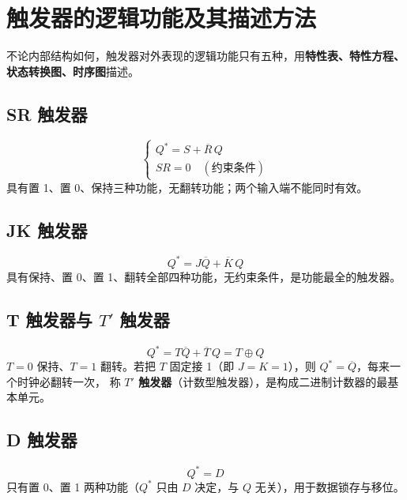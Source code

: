 \section{触发器的逻辑功能及其描述方法}
不论内部结构如何，触发器对外表现的逻辑功能只有五种，用\textbf{特性表、特性方程、状态转换图、时序图}描述。

\subsection{SR 触发器}
\begin{equation}
\begin{cases}
Q^* = S + \overline{R}\,Q\\
SR = 0 \quad(\text{约束条件})
\end{cases}
\label{eq:sr}
\end{equation}
具有置 1、置 0、保持三种功能，无翻转功能；两个输入端不能同时有效。

\subsection{JK 触发器}
\begin{equation}
Q^* = J\overline{Q} + \overline{K}\,Q
\label{eq:jk2}
\end{equation}
具有保持、置 0、置 1、翻转全部四种功能，无约束条件，是功能最全的触发器。

\subsection{T 触发器与 $T'$ 触发器}
\begin{equation}
Q^* = T\overline{Q} + \overline{T}\,Q = T \oplus Q
\label{eq:t}
\end{equation}
$T=0$ 保持、$T=1$ 翻转。若把 $T$ 固定接 1（即 $J=K=1$），则 $Q^*=\overline{Q}$，每来一个时钟必翻转一次，
称 \textbf{$T'$ 触发器}（计数型触发器），是构成二进制计数器的最基本单元。

\subsection{D 触发器}
\begin{equation}
Q^* = D
\label{eq:d}
\end{equation}
只有置 0、置 1 两种功能（$Q^*$ 只由 $D$ 决定，与 $Q$ 无关），用于数据锁存与移位。

